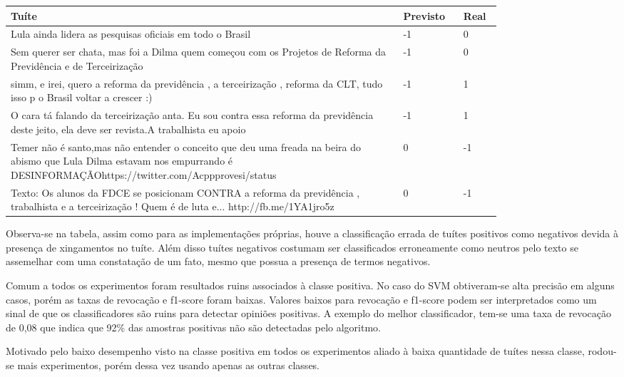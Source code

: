 \begin{table}[H]
	\centering
	\begin{tabular}{| p{0.8\linewidth} | l | l |}
		\hline
		Tuíte & Previsto & Real \\
		\hline
		Lula ainda lidera as pesquisas oficiais em todo o Brasil & -1 & 0 \\
		\hline
		Sem querer ser chata, mas foi a Dilma quem começou com os Projetos de Reforma da Previdência e de Terceirização & -1 & 0 \\
		\hline
		simm, e irei, quero a reforma da previdência , a terceirização , reforma da CLT, tudo isso p o Brasil voltar a crescer :) & -1 & 1 \\
		\hline
		O cara tá falando da terceirização anta. Eu sou contra essa reforma da previdência deste jeito, ela deve ser revista.A trabalhista eu apoio & -1 & 1 \\
		\hline
		Temer não é santo,mas não entender o conceito que deu uma freada na beira do abismo que Lula Dilma estavam nos empurrando é DESINFORMAÇÃOhttps://twitter.com/Acppprovesi/status & 0 & -1 \\
		\hline
		Texto: Os alunos da FDCE se posicionam CONTRA a reforma da previdência , trabalhista e a terceirização ! Quem é de luta e... http://fb.me/1YA1jro5z & 0 & -1 \\
		\hline
	\end{tabular}
\end{table}

Observa-se na tabela, assim como para as implementações próprias, houve a classificação errada
de tuítes positivos como negativos devida à presença de xingamentos no tuíte. Além disso tuítes
negativos costumam ser classificados erroneamente como neutros pelo texto se assemelhar com uma
constatação de um fato, mesmo que possua a presença de termos negativos.

Comum a todos os experimentos foram resultados ruins associados à classe positiva. No caso do SVM
obtiveram-se alta precisão em alguns casos, porém as taxas de revocação e f1-score foram baixas. Valores
baixos para revocação e f1-score podem ser interpretados como um sinal de que os classificadores
são ruins para detectar opiniões positivas. A exemplo do melhor classificador, tem-se uma taxa
de revocação de 0,08 que indica que 92\% das amostras positivas não são detectadas pelo algoritmo.

Motivado pelo baixo desempenho visto na classe positiva em todos os experimentos aliado à baixa
quantidade de tuítes nessa classe, rodou-se mais experimentos, porém dessa vez usando apenas as
outras classes.

